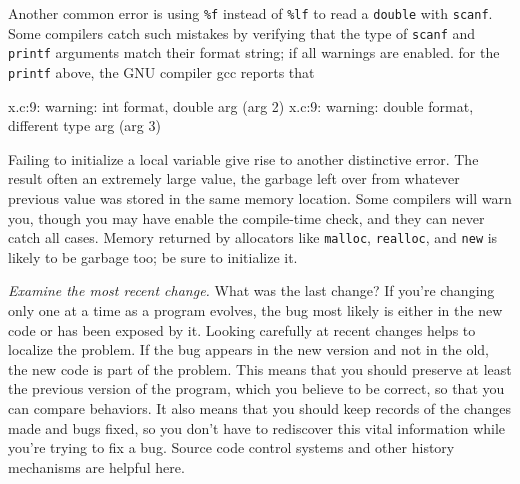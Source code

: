 Another common error is using \verb'%f' instead of \verb'%lf' to read a
\verb'double' with \verb'scanf'. Some compilers catch such mistakes by
verifying that the type of \verb'scanf' and \verb'printf' arguments match
their format string; if all warnings are enabled. for the \verb'printf'
above, the GNU compiler gcc reports that 
\begin{wellcode}
    x.c:9: warning: int format, double arg (arg 2)
    x.c:9: warning: double format, different type arg (arg 3)
\end{wellcode}

Failing to initialize a local variable give rise to another distinctive
error. The result often an extremely large value, the garbage left over
from whatever previous value was stored in the same memory location. Some
compilers will warn you, though you may have enable the compile-time check,
and they can never catch all cases. Memory returned by allocators like
\verb'malloc', \verb'realloc', and \verb'new' is likely to be garbage too;
be sure to initialize it.

\emph{Examine the most recent change.} What was the last change? If you're
changing only one at a time as a program evolves, the bug most likely is
either in the new code or has been exposed by it. Looking carefully at
recent changes helps to localize the problem. If the bug appears in the new
version and not in the old, the new code is part of the problem. This means
that you should preserve at least the previous version of the program,
which you believe to be correct, so that you can compare behaviors. It also
means that you should keep records of the changes made and bugs fixed, so
you don't have to rediscover this vital information while you're trying to
fix a bug. Source code control systems and other history mechanisms are
helpful here.

